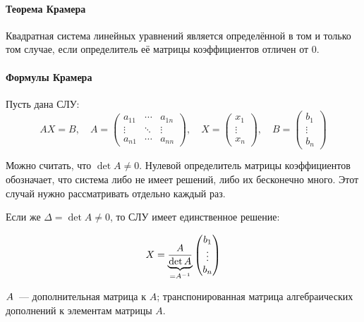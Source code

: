     \paragraph{Теорема Крамера}
    \begin{theorem}
      Квадратная система линейных уравнений является определённой в том и только том случае, если определитель её матрицы коэффициентов отличен от 0.
    \end{theorem}
    \paragraph{Формулы Крамера}
    \label{sle:cramer}

Пусть дана СЛУ:
$$
AX=B,\quad
A=
\begin{pmatrix}
a_{11} & \cdots & a_{1n} \\
\vdots & \ddots & \vdots \\
a_{n1} & \cdots & a_{nn}
\end{pmatrix}
,\quad
X=\begin{pmatrix}
x_1 \\ \vdots \\ x_n
\end{pmatrix}
,\quad
B=\begin{pmatrix}
b_1 \\ \vdots \\ b_n
\end{pmatrix}
$$

Можно считать, что $\det A\ne0$. Нулевой определитель матрицы
коэффициентов обозначает, что система либо не имеет решений, либо их
бесконечно много. Этот случай нужно рассматривать отдельно каждый раз.

Если же $\Delta=\det A\ne0$, то СЛУ имеет единственное решение:

$$
X=\underbrace{\frac{ A}{\det A}}_{=A^{-1}}
\begin{pmatrix}
  b_1 \\ \vdots \\ b_n
\end{pmatrix}
$$

\begin{note}
	$ A$~--- дополнительная матрица к $A$; транспонированная матрица
	алгебраических дополнений к элементам матрицы $A$.
	\begin{center}
  \end{center}
\end{note}

